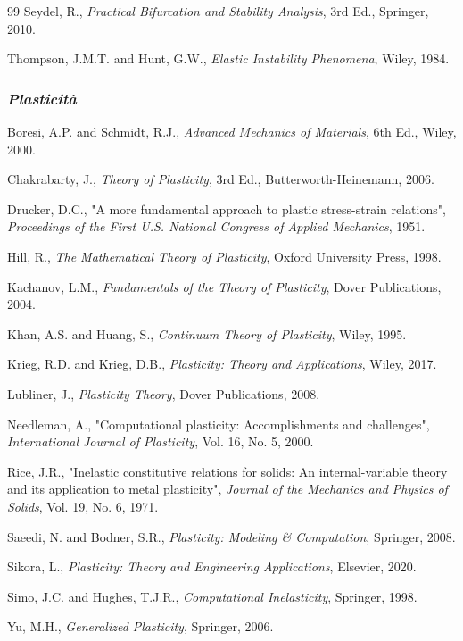 \begin{thebibliography}{99}
Seydel, R., {\em Practical Bifurcation and Stability Analysis}, 3rd Ed., Springer, 2010.

Thompson, J.M.T. and Hunt, G.W., {\em Elastic Instability Phenomena}, Wiley, 1984.





\vspace{0.6 cm}
\subsubsection{\emph{Plasticità}}


Boresi, A.P. and Schmidt, R.J., {\em Advanced Mechanics of Materials}, 6th Ed., Wiley, 2000.

Chakrabarty, J., {\em Theory of Plasticity}, 3rd Ed., Butterworth-Heinemann, 2006.

Drucker, D.C., "A more fundamental approach to plastic stress-strain relations", {\em Proceedings of the First U.S. National Congress of Applied Mechanics}, 1951.

Hill, R., {\em The Mathematical Theory of Plasticity}, Oxford University Press, 1998.

Kachanov, L.M., {\em Fundamentals of the Theory of Plasticity}, Dover Publications, 2004.

Khan, A.S. and Huang, S., {\em Continuum Theory of Plasticity}, Wiley, 1995.

Krieg, R.D. and Krieg, D.B., {\em Plasticity: Theory and Applications}, Wiley, 2017.

Lubliner, J., {\em Plasticity Theory}, Dover Publications, 2008.

Needleman, A., "Computational plasticity: Accomplishments and challenges", {\em International Journal of Plasticity}, Vol. 16, No. 5, 2000.

Rice, J.R., "Inelastic constitutive relations for solids: An internal-variable theory and its application to metal plasticity", {\em Journal of the Mechanics and Physics of Solids}, Vol. 19, No. 6, 1971.

Saeedi, N. and Bodner, S.R., {\em Plasticity: Modeling \& Computation}, Springer, 2008.

Sikora, L., {\em Plasticity: Theory and Engineering Applications}, Elsevier, 2020.

Simo, J.C. and Hughes, T.J.R., {\em Computational Inelasticity}, Springer, 1998.

Yu, M.H., {\em Generalized Plasticity}, Springer, 2006.


\end{thebibliography}
